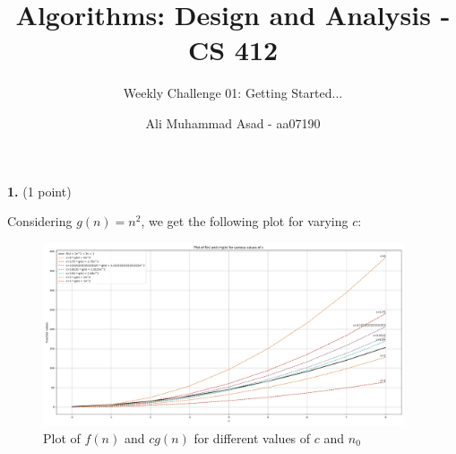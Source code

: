 \documentclass[addpoints]{exam}
\title{Algorithms: Design and Analysis - CS 412 \vspace*{-4mm}}
\author{Weekly Challenge 01: Getting Started...}
\date{\vspace*{-4mm} Ali Muhammad Asad - aa07190}
\begin{document}
\maketitle


\begin{questions}
  \question[1]
  \textbf{1.}\; (1 point)


  \begin{table}[H]
    \centering
  \end{table}

  \begin{solution}
    Considering $ g(n) = n^2 $, we get the following plot for varying $c$:
    \begin{figure}[H]
      \centering
      \includegraphics[width=0.95\textwidth]{Figure_1.png}
      \caption{ Plot of $f(n)$ and $cg(n)$ for different values of $c$ and $n_0$ }
    \end{figure}


\end{solution}
\end{questions}
\end{document}
